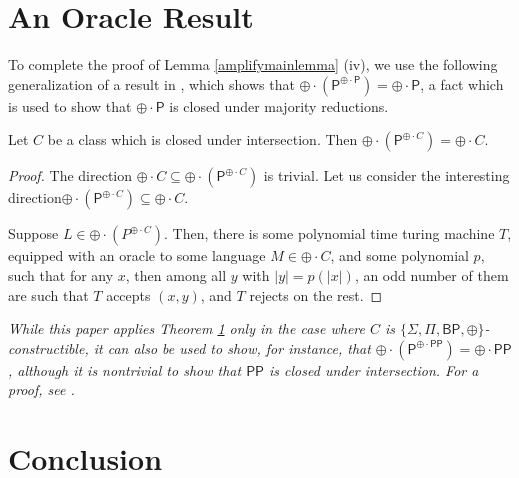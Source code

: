 \documentclass[11pt]{article}
\newcommand{\bp}{\textsf{BP}}
\newcommand{\parity}{\oplus}
\newcommand{\p}{\textsf{P}}
\newcommand{\pp}{\textsf{PP}}
\begin{document}
\section{An Oracle Result}\label{oracle}

To complete the proof of Lemma \ref{amplifymainlemma} (iv), we use the following generalization of a result in \cite{Toda}, which shows that $\parity \cdot (\p ^{\parity\cdot\p}) = \parity\cdot\p$, a fact which is used to show that $\parity \cdot \p$ is closed under majority reductions.

\begin{theorem}\label{oracleparityc}
Let $C$ be a class which is closed under intersection. Then \emph{$\parity \cdot (\p^{\parity \cdot C}) = \parity \cdot C$}.
\end{theorem}
\begin{proof}
The direction $\parity \cdot C \subseteq \parity \cdot (\p^{\parity \cdot C})$ is trivial. Let us consider the interesting direction\linebreak $\parity \cdot (\p^{\parity \cdot C})\subseteq \parity\cdot C$.

Suppose $L \in \parity \cdot (P^{\parity\cdot C})$. Then, there is some polynomial time turing machine $T$, equipped with an oracle to some language $M \in \parity\cdot C$, and some polynomial $p$, such that for any $x$, then among all $y$ with $|y| = p(|x|)$, an odd number of them are such that $T$ accepts $(x,y)$, and $T$ rejects on the rest.
\end{proof}
\begin{remark}\emph{
While this paper applies Theorem \ref{oracle} only in the case where $C$ is $\{\Sigma,\Pi,\bp,\parity\}$-constructible, it can also be used to show, for instance, that $\parity \cdot (\p^{\parity \cdot \pp}) = \parity \cdot \pp$, although it is nontrivial to show that $\pp$ is closed under intersection. For a proof, see \cite{Beigel}.
}\end{remark}

\section{Conclusion}

\pagebreak
\end{document}
